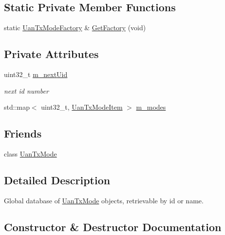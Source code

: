 \subsection*{Static Private Member Functions}
\begin{DoxyCompactItemize}
\item 
static \hyperlink{classns3_1_1UanTxModeFactory}{Uan\+Tx\+Mode\+Factory} \& \hyperlink{classns3_1_1UanTxModeFactory_aaabdc7689817c8be0532933bbc4ed95a}{Get\+Factory} (void)
\end{DoxyCompactItemize}
\subsection*{Private Attributes}
\begin{DoxyCompactItemize}
\item 
uint32\+\_\+t \hyperlink{classns3_1_1UanTxModeFactory_af0235fcd5bdfa884646d9c914ad1f1cb}{m\+\_\+next\+Uid}
\begin{DoxyCompactList}\small\item\em next id number \end{DoxyCompactList}\item 
std\+::map$<$ uint32\+\_\+t, \hyperlink{structns3_1_1UanTxModeFactory_1_1UanTxModeItem}{Uan\+Tx\+Mode\+Item} $>$ \hyperlink{classns3_1_1UanTxModeFactory_a592ab5ded8cde17edfd0ad97766df7a7}{m\+\_\+modes}
\end{DoxyCompactItemize}
\subsection*{Friends}
\begin{DoxyCompactItemize}
\item 
class \hyperlink{classns3_1_1UanTxModeFactory_ae8bf609f60f00cdc6f02713e8cfc8561}{Uan\+Tx\+Mode}
\end{DoxyCompactItemize}


\subsection{Detailed Description}
Global database of \hyperlink{classns3_1_1UanTxMode}{Uan\+Tx\+Mode} objects, retrievable by id or name. 

\subsection{Constructor \& Destructor Documentation}
